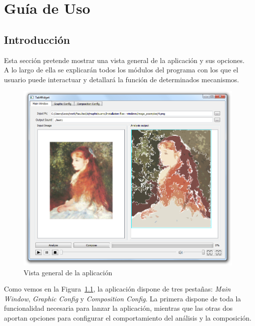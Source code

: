 \chapter{Guía de Uso}
\label{chap:guiauso}



	\section{Introducción}
		
		Esta sección pretende mostrar una vista general de la aplicación y sus opciones. \color{blue} A lo largo de ella se explicarán todos los módulos del programa con los que el usuario puede interactuar y detallará la función de determinados mecanismos.\color{black}\\
		
		\begin{figure}[htbp]
		\centering
		\hspace*{-0.3in}
		\includegraphics[scale=0.47]{graphics/interfazoverview.png}
		\caption{Vista general de la aplicación}
		\label{fig:interfazoverview}
		\end{figure}
		
		Como vemos en la Figura~\ref{fig:interfazoverview}, la aplicación dispone de tres pestañas:\color{blue} \emph{Main Window}, \emph{Graphic Config} y \emph{Composition Config}. La primera dispone de toda la funcionalidad necesaria para lanzar la aplicación, mientras que las otras dos aportan opciones para configurar el comportamiento del análisis y la composición.\color{black}\\
		
